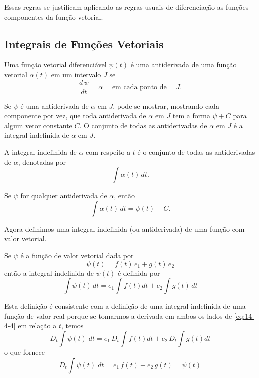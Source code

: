 Essas regras se justificam aplicando as regras usuais de diferenciação as funções componentes da função vetorial.

%
\subsection*{Integrais de Funções Vetoriais}
%
Uma função vetorial diferenciável $\psi(t)$ é uma antiderivada de uma função vetorial $\alpha(t)$ em um intervalo $J$ se
\begin{equation*}
\frac{d\, \psi}{dt} = \alpha \quad \text{ em cada ponto de } \quad  J.
\end{equation*}

Se $\psi$ é uma antiderivada de $\alpha$ em $J$, pode-se mostrar, mostrando cada componente por vez, que toda antiderivada de $\alpha$ em $J$ tem a
forma $\psi+C$ para algum vetor constante $C$. O conjunto de todas as antiderivadas de $\alpha$ em $J$ é a integral indefinida de $\alpha$ em $J$.

A integral indefinida de $\alpha$ com respeito a $t$ é o conjunto de todas as antiderivadas de $\alpha$, denotadas por
\begin{equation*}
\int \alpha(t)\, dt.
\end{equation*}

Se $\psi$ for qualquer antiderivada de $\alpha$, então
\begin{equation*}
  \int \alpha(t)\, dt = \psi(t) + C.
\end{equation*}


Agora definimos uma integral indefinida (ou antiderivada) de uma função com valor vetorial.
\begin{defi}\label{def:14-4-10}
Se \(\psi\) é a função de valor vetorial dada por
\begin{equation*}
\psi(t) = f(t)\, e_{1} + g(t)\,e_{2}
\end{equation*}
então a integral indefinida de \(\psi(t)\) é definida por
\begin{equation}\label{eq:14-4-4}
\int \psi(t)\,dt = e_{1}\int f(t)dt + e_{2}\int g(t)\,dt
\end{equation}
\end{defi}

Esta definição é consistente com a definição de uma integral indefinida de uma função de valor real porque se tomarmos a derivada em ambos os lados de \eqref{eq:14-4-4} em relação a \(t\), temos
\begin{equation*}
D_{t} \int \psi(t)\;dt = e_{1}\,D_{t}\int f(t)dt + e_{2}\, D_{t} \int g(t)dt
\end{equation*}
o que fornece
\begin{equation*}
D_{t}\int \psi(t)\; dt = e_{1}\, f(t) + e_{2}\, g(t)= \psi(t)
\end{equation*}


